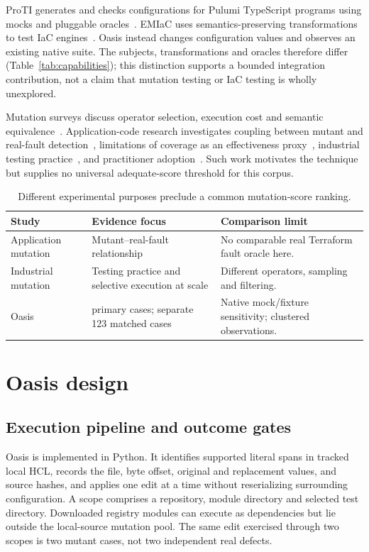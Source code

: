 

ProTI generates and checks configurations for Pulumi TypeScript programs using mocks and pluggable oracles~\cite{proti}. EMIaC uses semantics-preserving transformations to test IaC engines~\cite{emiac}. Oasis instead changes configuration values and observes an existing native suite. The subjects, transformations and oracles therefore differ (Table~\ref{tab:capabilities}); this distinction supports a bounded integration contribution, not a claim that mutation testing or IaC testing is wholly unexplored.

Mutation surveys discuss operator selection, execution cost and semantic equivalence~\cite{jia,papadakis,madeyski}. Application-code research investigates coupling between mutant and real-fault detection~\cite{just}, limitations of coverage as an effectiveness proxy~\cite{coverage}, industrial testing practice~\cite{practices,scale}, and practitioner adoption~\cite{sanchez}. Such work motivates the technique but supplies no universal adequate-score threshold for this corpus.

\begin{table}[ht]
\caption{Different experimental purposes preclude a common mutation-score ranking.}\label{tab:application}
\small\begin{tabularx}{\linewidth}{@{}p{3.1 cm}X X@{}}\toprule
Study & Evidence focus & Comparison limit\\\midrule
Application mutation~\cite{just} & Mutant--real-fault relationship & No comparable real Terraform fault oracle here.\\
Industrial mutation~\cite{practices,scale} & Testing practice and selective execution at scale & Different operators, sampling and filtering.\\
Oasis & \NScored{} primary cases; separate 123 matched cases & Native mock/fixture sensitivity; clustered observations.\\\bottomrule
\end{tabularx}\end{table}

\section{Oasis design}\label{sec:design}
\subsection{Execution pipeline and outcome gates}
Oasis is implemented in Python. It identifies supported literal spans in tracked local HCL, records the file, byte offset, original and replacement values, and source hashes, and applies one edit at a time without reserializing surrounding configuration. A scope comprises a repository, module directory and selected test directory. Downloaded registry modules can execute as dependencies but lie outside the local-source mutation pool. The same edit exercised through two scopes is two mutant cases, not two independent real defects.

